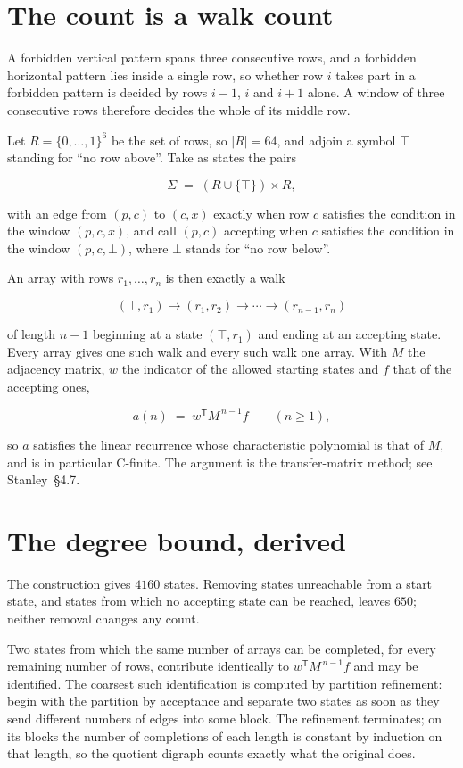 \documentclass[11pt]{article}
\theoremstyle{definition}
\begin{document}
\section{The count is a walk count}

A forbidden vertical pattern spans three consecutive rows, and a forbidden horizontal pattern lies inside a single row, so whether row $i$ takes part in a forbidden pattern is decided by rows $i-1$, $i$ and $i+1$ alone. A window of three consecutive rows therefore decides the whole of its middle row.

Let $R = \{0,\dots,1\}^{6}$ be the set of rows, so $|R| = 64$, and adjoin a symbol $\top$ standing for ``no row above''. Take as states the pairs

\[\Sigma \;=\; (R \cup \{\top\}) \times R,\]

with an edge from $(p,c)$ to $(c,x)$ exactly when row $c$ satisfies the condition in the window $(p,c,x)$, and call $(p,c)$ accepting when $c$ satisfies the condition in the window $(p,c,\bot)$, where $\bot$ stands for ``no row below''.

An array with rows $r_1,\dots,r_n$ is then exactly a walk

\[(\top,r_1) \to (r_1,r_2) \to \cdots \to (r_{n-1},r_n)\]

of length $n-1$ beginning at a state $(\top,r_1)$ and ending at an accepting state. Every array gives one such walk and every such walk one array. With $M$ the adjacency matrix, $w$ the indicator of the allowed starting states and $f$ that of the accepting ones,

\[a(n) \;=\; w^{\mathsf T} M^{\,n-1} f \qquad (n \ge 1),\]

so $a$ satisfies the linear recurrence whose characteristic polynomial is that of $M$, and is in particular C-finite. The argument is the transfer-matrix method; see Stanley~\S4.7.

\section{The degree bound, derived}

The construction gives $4160$ states. Removing states unreachable from a start state, and states from which no accepting state can be reached, leaves $650$; neither removal changes any count.

Two states from which the same number of arrays can be completed, for every remaining number of rows, contribute identically to $w^{\mathsf T}M^{\,n-1}f$ and may be identified. The coarsest such identification is computed by partition refinement: begin with the partition by acceptance and separate two states as soon as they send different numbers of edges into some block. The refinement terminates; on its blocks the number of completions of each length is constant by induction on that length, so the quotient digraph counts exactly what the original does.
\end{document}
